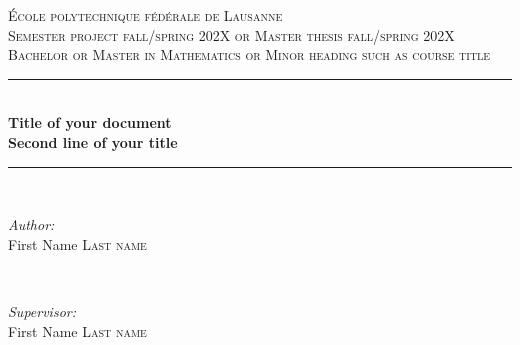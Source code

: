 \begin{titlepage}
\newcommand{\HRule}{\rule{\linewidth}{0.5mm}} %

\center %
 

\vspace{3cm}
\textsc{\LARGE École polytechnique fédérale de Lausanne}\\[1.5cm] %
\textsc{\Large Semester project fall/spring 202X or Master thesis fall/spring 202X}\\[0.5cm] %
\textsc{\large Bachelor or Master in Mathematics or Minor heading such as course title}\\[0.5cm] %


\HRule \\[0.4cm] %
{ \huge \bfseries Title of your document \\ Second line of your title}\\[0.4cm] %
\HRule \\[1.5cm]
 

\begin{minipage}{0.4\textwidth}
\begin{flushleft} \large
\emph{Author:}\\
First Name \textsc{Last name} %
\end{flushleft}
\end{minipage}
~
\begin{minipage}{0.4\textwidth}
\begin{flushright} \large
\emph{Supervisor:} \\
First Name \textsc{Last name} %
\end{flushright}
\end{minipage}\\[10cm]


\end{titlepage}

